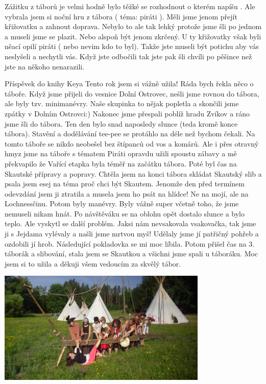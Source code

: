 \begin{multicols}{2}
Zážitku z táborů je velmi hodně bylo těžké se rozhodnout o kterém napíšu . Ale vybrala jsem si noční hru z tábora ( téma: piráti ). Měli jsme jenom přejít křižovatku a zahnout doprava. Nebylo to ale tak lehký protože jsme šli po jednom a museli jsme se plazit. Nebo alspoň být jenom zkrčený. U ty křižovatky však byli něací opilí piráti ( nebo nevim kdo to byl). Takže jste museli být potichu aby vás neslyšeli a nechytli vás. Když jste odbočili tak jste pak šli chvíli po pěšince než jste na někoho nenarazili.


\columnbreak

Příspěvek do knihy Keya
Tento rok jsem si vážně užila! Ráda bych řekla něco o táboře. Když jsme přijeli do vesnice Dolní Ostrovec, nešli jsme rovnou do tábora, ale byly tzv. minimanévry. Naše skupinka to nějak popletla a skončili jsme zpátky v Dolním Ostrovci:) Nakonec jsme přespali poblíž hradu Zvíkov a ráno jsme šli do tábora. Ten den bylo snad naposledy slunce (teda kromě konce tábora). Stavění a dodělávání tee-pee se protáhlo na déle než bychom čekali. Na tomto táboře se nikdo neobešel bez štípanců od vos a komárů. Ale i přes otravný hmyz jsme na táboře s tématem Piráti opravdu užili spoustu zábavy a mě překvapilo že Vařící etapka byla téměř na začátku tábora. Poté byl čas na Skautské přípravy a popravy. Chtěla jsem na konci tábora skládat Skautský slib a psala jsem esej na téma proč chci být Skautem. Jenomže den před termínem odevzdání jsem ji ztratila a musela jsem ho psát na hlídce! Ne na mojí, ale na Lochnessčinu. Potom byly manévry. Byly vážně super včetně toho, že jsme nemuseli nikam hnát. Po návštěváku se na oblohu opět dostalo slunce a bylo teplo. Ale vyskytl se další problém. Jaksi nám nevsakovala vsakovačka, tak jsme ji s Jejdama vylévaly a našli jsme mrtvou myš! Udělaly jsme jí patřičný pohřeb a ozdobili jí hrob. Následující pokladovka se mi moc líbila. Potom přišel čas na 3. táborák a slibování, stala jsem se Skautkou a všichni jsme spali u táboráku. Moc jsem si to užila a děkuji všem vedoucím za skvělý tábor.



\end{multicols}

\begin{center}

\includegraphics[width=10cm]{img/druziny/jejdove.jpg}

\end{center}


